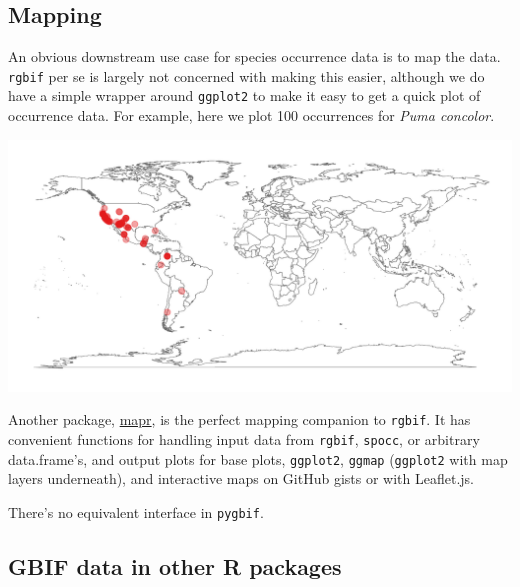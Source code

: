 \documentclass[author-year, review, 11pt]{components/elsarticle} %
\makeatletter
\newenvironment{Shaded}{\begin{snugshade}}{\end{snugshade}}
\newcommand{\KeywordTok}[1]{\textcolor[rgb]{0.13,0.29,0.53}{\textbf{{#1}}}}
\newcommand{\DataTypeTok}[1]{\textcolor[rgb]{0.13,0.29,0.53}{{#1}}}
\newcommand{\DecValTok}[1]{\textcolor[rgb]{0.00,0.00,0.81}{{#1}}}
\newcommand{\StringTok}[1]{\textcolor[rgb]{0.31,0.60,0.02}{{#1}}}
\newcommand{\OtherTok}[1]{\textcolor[rgb]{0.56,0.35,0.01}{{#1}}}
\newcommand{\NormalTok}[1]{{#1}}
\def\maxwidth{\ifdim\Gin@nat@width>\linewidth\linewidth
\else\Gin@nat@width\fi}
\let\Oldincludegraphics\includegraphics
\renewcommand{\includegraphics}[1]{\Oldincludegraphics[width=\maxwidth]{#1}}
\makeatother
\begin{document}
\subsection{Mapping}\label{mapping}

An obvious downstream use case for species occurrence data is to map the
data. \texttt{rgbif} per se is largely not concerned with making this
easier, although we do have a simple wrapper around \texttt{ggplot2} to
make it easy to get a quick plot of occurrence data. For example, here
we plot 100 occurrences for \emph{Puma concolor}.

\begin{Shaded}
\end{Shaded}

\includegraphics{components/figure/manuscript-unnamed-chunk-34-1.pdf}

Another package, \href{https://github.com/ropensci/mapr}{mapr}, is the
perfect mapping companion to \texttt{rgbif}. It has convenient functions
for handling input data from \texttt{rgbif}, \texttt{spocc}, or
arbitrary data.frame's, and output plots for base plots,
\texttt{ggplot2}, \texttt{ggmap} (\texttt{ggplot2} with map layers
underneath), and interactive maps on GitHub gists or with Leaflet.js.

There's no equivalent interface in \texttt{pygbif}.

\subsection{GBIF data in other R
packages}\label{gbif-data-in-other-r-packages}
\end{document}
